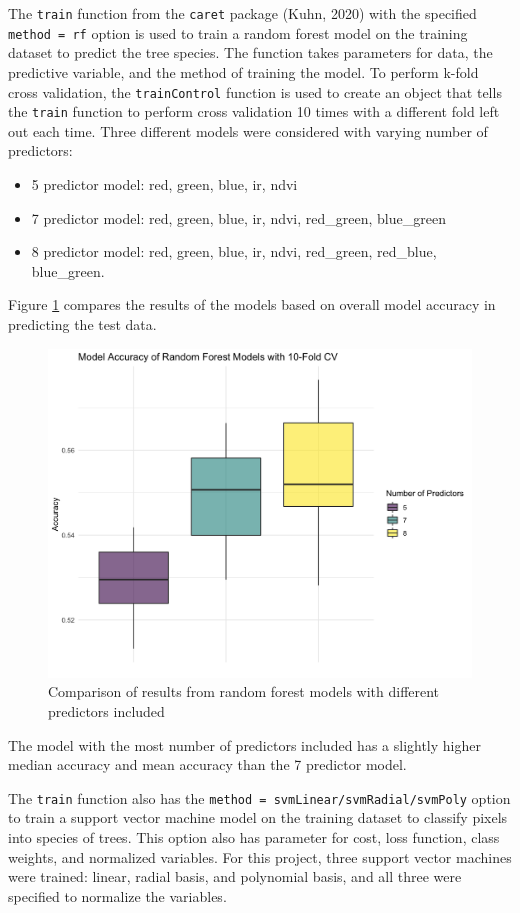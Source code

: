 \documentclass[12pt,twoside]{reedthesis}
\begin{document}
The \texttt{train} function from the \texttt{caret} package (Kuhn, 2020) with the specified \texttt{method\ =\ rf} option is used to train a random forest model on the training dataset to predict the tree species. The function takes parameters for data, the predictive variable, and the method of training the model. To perform k-fold cross validation, the \texttt{trainControl} function is used to create an object that tells the \texttt{train} function to perform cross validation 10 times with a different fold left out each time. Three different models were considered with varying number of predictors:
\begin{itemize}
\item
  5 predictor model: red, green, blue, ir, ndvi
\item
  7 predictor model: red, green, blue, ir, ndvi, red\_green, blue\_green
\item
  8 predictor model: red, green, blue, ir, ndvi, red\_green, red\_blue, blue\_green.
\end{itemize}
Figure \ref{fig:rfresults} compares the results of the models based on overall model accuracy in predicting the test data.
\begin{figure}

{\centering \includegraphics[width=0.4\linewidth]{figure/rfresults} 

}

\caption{Comparison of results from random forest models with different predictors included}\label{fig:rfresults}
\end{figure}
The model with the most number of predictors included has a slightly higher median accuracy and mean accuracy than the 7 predictor model.

The \texttt{train} function also has the \texttt{method\ =\ svmLinear/svmRadial/svmPoly} option to train a support vector machine model on the training dataset to classify pixels into species of trees. This option also has parameter for cost, loss function, class weights, and normalized variables. For this project, three support vector machines were trained: linear, radial basis, and polynomial basis, and all three were specified to normalize the variables.
\end{document}

